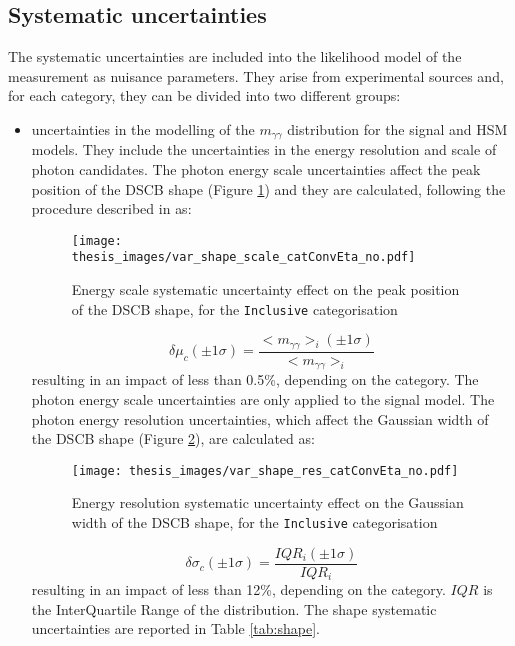 \documentclass[a4paper, oneside, 11pt, openright]{book}
\begin{document}
 			
 			
 			\subsection{Systematic uncertainties}\label{section:syst}
 				The systematic uncertainties are included into the likelihood model of the measurement as nuisance parameters. They arise from experimental sources and, for each category, they can be divided into two different groups: 
 				\begin{itemize}
 					\item uncertainties in the modelling of the $m_{\gamma\gamma}$ distribution for the signal and HSM models. They include the uncertainties in the energy resolution and scale of photon candidates. The photon energy scale uncertainties affect the peak position of the DSCB shape (Figure \ref{fig:scale_syst}) and they are calculated, following the procedure described in \cite{Aad_2019} as:
 					\begin{figure}
 						\centering
 						\texttt{[image: thesis\_images/var\_shape\_scale\_catConvEta\_no.pdf]}
 						\caption{Energy scale systematic uncertainty effect on the peak position of the DSCB shape, for the \texttt{Inclusive} categorisation}
 						\label{fig:scale_syst}
 					\end{figure}
 					\begin{equation}\label{eq:shape_syst}
 						\delta\mu_c(\pm1\sigma)=\frac{<m_{\gamma\gamma}>_i(\pm1\sigma)}{<m_{\gamma\gamma}>_i}
 					\end{equation}
 					resulting in an impact of less than 0.5\%, depending on the category. The photon energy scale uncertainties are only applied to the signal model. The photon energy resolution uncertainties, which affect the Gaussian width of the DSCB shape (Figure \ref{fig:res_syst}), are calculated \cite{Aad_2019} as:
 					\begin{figure}
 						\centering
 						\texttt{[image: thesis\_images/var\_shape\_res\_catConvEta\_no.pdf]}
 						\caption{Energy resolution systematic uncertainty effect on the Gaussian width of the DSCB shape, for the \texttt{Inclusive} categorisation}
 						\label{fig:res_syst}
 					\end{figure}
 					\begin{equation}\label{eq:res_syst}
 						\delta\sigma_c(\pm1\sigma)=\frac{IQR_i(\pm1\sigma)}{IQR_i}
 					\end{equation}
 					resulting in an impact of less than 12\%, depending on the category. $IQR$ is the InterQuartile Range of the distribution. The shape systematic uncertainties are reported in Table \ref{tab:shape}.

\end{itemize}
\end{document}
